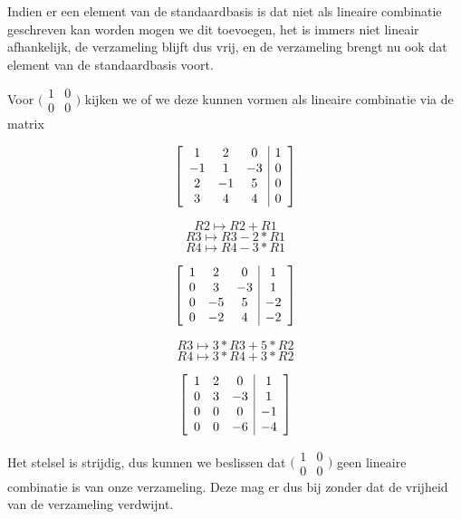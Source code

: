 \documentclass[lineaire_algebra_oplossingen.tex]{subfiles}
\begin{document}
Indien er een element van de standaardbasis is dat niet als lineaire combinatie geschreven kan worden mogen we dit toevoegen, het is immers niet lineair afhankelijk, de verzameling blijft dus vrij, en de verzameling brengt nu ook dat element van de standaardbasis voort.

Voor $\bigl(
\begin{smallmatrix}
1&0\\ 0&0
\end{smallmatrix}
\bigr)$ kijken we of we deze kunnen vormen als lineaire combinatie via de matrix

\[
\left[
\begin{array}{c c c | c}
1 & 2 & 0 & 1\\
-1 & 1 & -3 & 0\\
2 & -1 & 5 & 0\\
3 & 4 & 4 & 0
\end{array}
\right]
\]

\[R2 \mapsto R2 + R1 \]
\[R3 \mapsto R3 - 2*R1 \]
\[R4 \mapsto R4 - 3*R1 \]

\[
\left[
\begin{array}{c c c | c}
1 & 2 & 0 & 1\\
0 & 3 & -3 & 1\\
0 & -5 & 5 & -2\\
0 & -2 & 4 & -2
\end{array}
\right]
\]

\[R3 \mapsto 3*R3 + 5*R2 \]
\[R4 \mapsto 3*R4 + 3*R2 \]

\[
\left[
\begin{array}{c c c | c}
1 & 2 & 0 & 1\\
0 & 3 & -3 & 1\\
0 & 0 & 0 & -1\\
0 & 0 & -6 & -4
\end{array}
\right]
\]

Het stelsel is strijdig, dus kunnen we beslissen dat $\bigl(
\begin{smallmatrix}
1&0\\ 0&0
\end{smallmatrix}
\bigr)$ geen lineaire combinatie is van onze verzameling. Deze mag er dus bij zonder dat de vrijheid van de verzameling verdwijnt.\\
\end{document}

